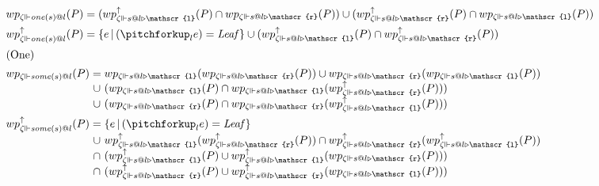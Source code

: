\begin{figure}
\begin{align*}
    &wp_{\zeta \Vdash \mathit{one}(s) @ l}(P) = (wp_{\zeta \Vdash s@l\triangleright \mathscr{l}} ^ \uparrow (P) \cap wp_{\zeta \Vdash s@l \triangleright \mathscr{r}}(P)) \cup (wp_{\zeta \Vdash s@l\triangleright \mathscr{r}} ^ \uparrow (P) \cap wp_{\zeta \Vdash s@l \triangleright \mathscr{l}}(P))
    \\
    &wp_{\zeta \Vdash \mathit{one}(s) @ l} ^ \uparrow (P) = \{e \barr (\pitchforkup_l e) = \mathit{Leaf}\} \cup (wp_{\zeta \Vdash s@l\triangleright \mathscr{l}} ^ \uparrow(P) \cap wp_{\zeta \Vdash s@l \triangleright \mathscr{r}}  ^ \uparrow(P))
    \\\intertext{\centering(One)}
    &\begin{array}{@{}l@{\;}c@{\;}l}wp_{\zeta \Vdash \mathit{some}(s) @ l}(P) &=&
    wp_{\zeta \Vdash s@l\triangleright \mathscr{l}}(wp_{\zeta \Vdash s@l \triangleright \mathscr{r}}(P)) \cup wp_{\zeta \Vdash s@l\triangleright \mathscr{r}}(wp_{\zeta \Vdash s@l \triangleright \mathscr{l}} (P)) \\
    &\cup& (wp_{\zeta \Vdash s@l\triangleright \mathscr{l}}(P) \cap wp_{\zeta \Vdash s@l\triangleright \mathscr{l}} (wp_{\zeta \Vdash s@l\triangleright \mathscr{r}}^\uparrow (P)))\\
    &\cup& (wp_{\zeta \Vdash s@l\triangleright \mathscr{r}}(P) \cap wp_{\zeta \Vdash s@l\triangleright \mathscr{r}} (wp_{\zeta \Vdash s@l\triangleright \mathscr{l}}^\uparrow (P)))
    \end{array}
    \\
    &\begin{array}{@{}l@{\;}c@{\;}l}wp_{\zeta \Vdash \mathit{some}(s) @ l} ^ \uparrow (P) &=& \{e \barr (\pitchforkup_l e) = \mathit{Leaf}\}
    \\&\cup& wp_{\zeta \Vdash s@l\triangleright \mathscr{l}}^\uparrow (wp_{\zeta \Vdash s@l \triangleright \mathscr{r}}^\uparrow (P)) \cap wp_{\zeta \Vdash s@l\triangleright \mathscr{r}}^\uparrow (wp_{\zeta \Vdash s@l \triangleright \mathscr{l}}^\uparrow (P)) \\
    &\cap& (wp_{\zeta \Vdash s@l\triangleright \mathscr{l}}^\uparrow(P) \cup wp_{\zeta \Vdash s@l\triangleright \mathscr{l}}^\uparrow (wp_{\zeta \Vdash s@l\triangleright \mathscr{r}} (P)))\\
    &\cap& (wp_{\zeta \Vdash s@l\triangleright \mathscr{r}}^\uparrow(P) \cup wp_{\zeta \Vdash s@l\triangleright \mathscr{r}}^\uparrow (wp_{\zeta \Vdash s@l\triangleright \mathscr{l}}(P)))
    \end{array}

\end{align*}
\end{figure}

